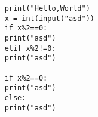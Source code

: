 \documentclass[UTF8]{ctexart}
\begin{document}
\lstset{language=python}
\begin{lstlisting}
    print("Hello,World")
    x = int(input("asd"))
    if x%2==0:
    print("asd")
    elif x%2!=0:
    print("asd")

    if x%2==0:
    print("asd")
    else:
    print("asd")
\end{lstlisting}
\end{document}
